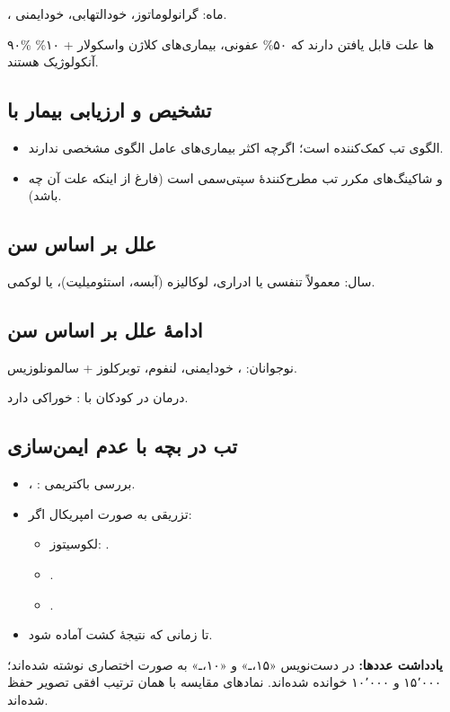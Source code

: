 \documentclass[12pt,a4paper]{article}
\begin{document}
،  ماه: گرانولوماتوز، خودالتهابی، خودایمنی.

۹۰\% ها علت قابل یافتن دارند که ۵۰\% عفونی،  بیماری‌های کلاژن واسکولار + ۱۰\% آنکولوژیک هستند.

\subsection*{تشخیص و ارزیابی بیمار با }
\begin{itemize}
\item الگوی تب کمک‌کننده است؛ اگرچه اکثر بیماری‌های عامل  الگوی مشخصی ندارند.
\item {} و شاکینگ‌های مکرر تب مطرح‌کنندهٔ سپتی‌سمی است (فارغ از اینکه علت آن چه باشد).
\end{itemize}

\subsection*{علل  بر اساس سن}
 سال: معمولاً تنفسی یا ادراری، لوکالیزه (آبسه، استئومیلیت)،  یا لوکمی.

\subsection*{ادامهٔ علل بر اساس سن}
نوجوانان: ، خودایمنی، لنفوم، توبرکلوز + سالمونلوزیس.

درمان در کودکان با :  خوراکی دارد.

\subsection*{تب در بچه با عدم ایمن‌سازی}
\begin{itemize}
\item {}، : بررسی باکتریمی.
\item {} تزریقی به صورت امپریکال اگر:
\begin{itemize}
\item لکوسیتوز: .
\item {}.
\item {} .
\end{itemize}
\item تا زمانی که نتیجهٔ کشت آماده شود.
\end{itemize}
\textbf{یادداشت عددها:} در دست‌نویس «۱۵،ـ» و «۱۰،ـ» به صورت اختصاری نوشته شده‌اند؛ ۱۵٬۰۰۰ و ۱۰٬۰۰۰ خوانده شده‌اند. نمادهای مقایسه با همان ترتیب افقی تصویر حفظ شده‌اند.
\end{document}
